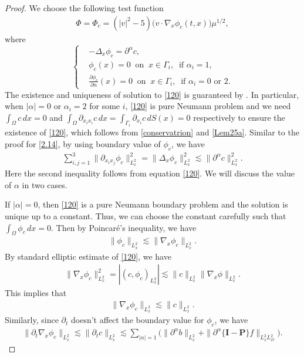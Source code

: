 \documentclass[reqno,a4paper]{amsart}
\numberwithin{equation}{section}
\newcommand{\1}{\mathbf{1}}
\renewcommand{\P}{\mathbf{P}}
\newcommand{\pa}{\partial}
\newcommand{\na}{\nabla}
\newcommand{\<}{\langle}
\renewcommand{\>}{\rangle}
\newcommand{\I}{\mathbf{I}}
\renewcommand{\P}{\mathbf{P}}
\begin{document}
\begin{proof}
		
		
		
		\medskip {} We choose the following test function 
		\begin{align*}
			{\Phi} = {\Phi_c} = (|v|^2-5)\big(v\cdot{\nabla_{x}\phi_c}(t,x)\big)\mu^{1/2},
		\end{align*}
		where 				
		\begin{equation}\label{120}\left\{\begin{aligned}
				&-\Delta_x \phi_c = {\partial^\alpha c},\\
				&{\phi_c}(x)= 0 \ \text{ on }\ x\in \Gamma_i,\ \text{ if }\alpha_i = 1,\\
				&\frac{\partial\phi_c}{\partial n}(x)= 0\ \text{ on }\ x\in \Gamma_i,\ \text{ if }\alpha_i = 0\text{ or } 2.
			\end{aligned}\right.
		\end{equation}
	The existence and uniqueness of solution to \eqref{120} is guaranteed by \cite[Lamma 4.4.3.1]{Grisvard1985}. In particular, when $|\alpha|=0$ or $\alpha_i=2$ for some $i$, \eqref{120} is pure Neumann problem and we need
	$\int_{\Omega}c\,dx=0$ and  $\int_{\Omega}\partial_{x_ix_i}c\,dx=\int_{\Gamma_i}\partial_{x_i}c\,dS(x)=0$ respectively to ensure the existence of \eqref{120}, which follows from \eqref{conservatrion} and \eqref{Lem25a}. 
	Similar to the proof for \eqref{2.14}, by using boundary value of $\phi_c$, we have 
	\begin{align}\label{3.8}
		\sum_{i,j=1}^3\|\partial_{x_ix_j}{\phi_c}\|_{L^2_{x}}^2 = \|\Delta_x\phi_c\|_{L^2_x}^2 \lesssim \|\partial^\alpha c\|^2_{L^2_x}. 
	\end{align}
Here the second inequality follows from equation \eqref{120}. 
We will discuss the value of $\alpha$ in two cases. 

If $|\alpha|=0$, then \eqref{120} is a pure Neumann boundary problem and the solution is unique up to a constant. Thus, we can choose the constant carefully such that 
$\int_\Omega \phi_c\,dx=0$. Then by Poincar\'{e}'s inequality, we have 
\begin{align*}
	\|\phi_c\|_{L^2_x}\lesssim \|\na_x\phi_c\|_{L^2_x}. 
\end{align*}
By standard elliptic estimate of \eqref{120}, we have 
\begin{align}\label{3.18a}
	\|\na_x\phi_c\|_{L^2_x}^2=|(c,\phi_c)_{L^2_x}|\lesssim \|c\|_{L^2_x}\|\na_x\phi\|_{L^2_x}.
\end{align}
This implies that 
\begin{align}\label{3.9a}
	\|\na_x\phi_c\|_{L^2_x}\lesssim \|c\|_{L^2_x}. 
\end{align}
Similarly, since $\pa_t$ doesn't affect the boundary value for $\phi_c$, we have 
\begin{align}\label{3.10a}
	\|\pa_t\na_x\phi_c\|_{L^2_x}\lesssim \|\pa_tc\|_{L^2_x}\lesssim \sum_{|\alpha|=1}\Big(\|\partial^\alpha b\|_{L^2_x}+\|\pa^\alpha\{\I-\P\}f\|_{L^2_xL^2_D}\Big). 
\end{align}


\end{proof}
\end{document}
